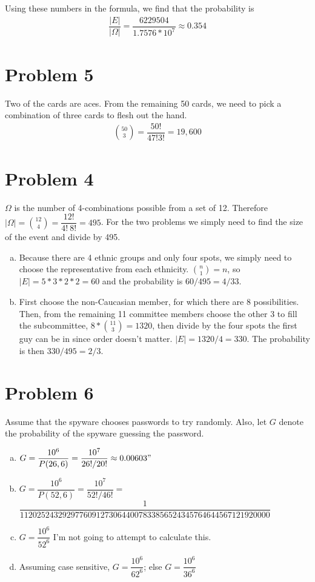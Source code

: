 \documentclass[11pt]{article}
\begin{document}
Using these numbers in the formula, we find that the probability is
	\begin{align*}
		\dfrac{|E|}{|\Omega|} = \dfrac{6229504}{1.7576 * 10^7} \approx 0 .354
	\end{align*}


\section*{Problem 5}
Two of the cards are aces. From the remaining 50 cards, we need to pick a combination of three cards to flesh out the hand.
\begin{align*}
	\binom{50}{3} = \dfrac{50!}{47!3!} =19,600
\end{align*}

\section*{Problem 4}
	$\Omega$ is the number of 4-combinations possible from a set of 12. Therefore $|\Omega| = \binom{12}{4} = \dfrac{12!}{4!\ 8!} = 495$. For the two problems we simply need to find the size of the event and divide by 495.
	
\begin{enumerate}[(a)]
	\item Because there are 4 ethnic groups and only four spots, we simply need to choose the representative from each ethnicity. $\binom{n}{1} = n$, so $|E| = 5*3*2*2 = 60$ and the probability is $60/495 = 4/33$.
	\item  First choose the non-Caucasian member, for which there are 8 possibilities. Then, from the remaining 11 committee members choose the other 3 to fill the subcommittee, $8 * \binom{11}{3} = 1320$, then divide by the four spots the first guy can be in since order doesn't matter. $|E| = 1320/4 = 330$. The probability is then $330/495 = 2/3$.
\end{enumerate}

\section*{Problem 6}
Assume that the spyware chooses passwords to try randomly. Also, let $G$ denote the probability of the spyware guessing the password.

\begin{enumerate}[(a)]
	\item $G = \dfrac{10^6}{P(26, 6)} = \dfrac{10^7}{26!/20!} \approx 0.00603"$
	\item $G = \dfrac{10^6}{P(52, 6)} = \dfrac{10^7}{52!/46!} =$\\
	$\dfrac{1}{11202524329297760912730644007833856524345764644567121920000}$
	\item $G = \dfrac{10^6}{52^6}$ I'm not going to attempt to calculate this.
	\item Assuming case sensitive, $G = \dfrac{10^6}{62^6}$; else $G = \dfrac{10^6}{36^6}$

	
\end{enumerate}
\end{document}
